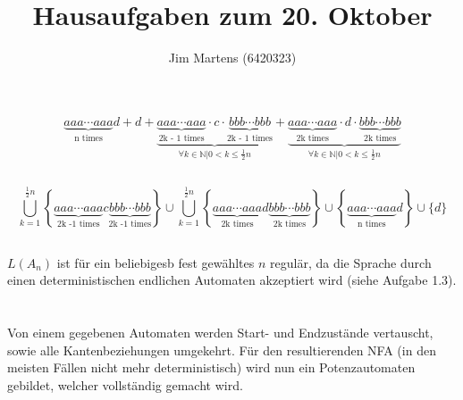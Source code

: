 \documentclass[10pt,a4paper,oneside,ngerman,numbers=noenddot]{scrartcl}
\begin{document}
\author{Jim Martens (6420323)}
\title{Hausaufgaben zum 20. Oktober}
\maketitle

\setcounter{section}{2}
\section{} %
	\subsection{} %
	\[\underbrace{aaa \cdots aaa}_{\text{n times}}d + d + \underbrace{\underbrace{aaa \cdots aaa}_{\text{2k - 1 times}} \cdot c \cdot \underbrace{bbb \cdots bbb}_{\text{2k - 1 times}}}_{\forall k \in \mathbb{N}| 0 < k \leq \frac{1}{2}n} + \underbrace{\underbrace{aaa \cdots aaa}_{\text{2k times}} \cdot d \cdot \underbrace{bbb \cdots bbb}_{\text{2k times}}}_{\forall k \in \mathbb{N}| 0 < k \leq \frac{1}{2}n}\]
	\subsection{}
	\[\bigcup\limits_{k = 1}^{\frac{1}{2}n} \left\lbrace \underbrace{aaa \cdots aaa}_{\text{2k -1 times}} c \underbrace{bbb \cdots bbb}_{\text{2k -1 times}}\right\rbrace \cup \bigcup\limits_{k = 1}^{\frac{1}{2}n} \left\lbrace \underbrace{aaa \cdots aaa}_{\text{2k times}} d \underbrace{bbb \cdots bbb}_{\text{2k times}}\right\rbrace \cup \left\lbrace \underbrace{aaa \cdots aaa}_{\text{n times}}d\right\rbrace \cup \{d\}\]
	\subsection{}
	\subsection{}
	\(L(A_{n})\) ist für ein beliebigesb fest gewähltes \(n\) regulär, da die Sprache durch einen deterministischen endlichen Automaten akzeptiert wird (siehe Aufgabe 1.3).
\section{} %
	\subsection{}
	Von einem gegebenen Automaten werden Start- und Endzustände vertauscht, sowie alle Kantenbeziehungen umgekehrt. Für den resultierenden NFA (in den meisten Fällen nicht mehr deterministisch) wird nun ein Potenzautomaten gebildet, welcher vollständig gemacht wird.
\end{document}
